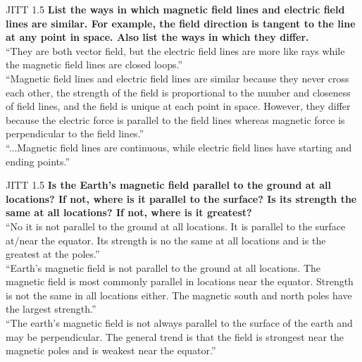 \documentclass{beamer}
\begin{document}
\begin{frame}{JITT 1.5}
\small
\textbf{List the ways in which magnetic field lines and electric field lines are similar. For example, the field direction is tangent to the line at any point in space. Also list the ways in which they differ.} \\ \vspace{0.5cm}
``They are both vector field, but the electric field lines are more like rays while the magnetic field lines are closed loops.'' \\ \vspace{0.5cm}
``Magnetic field lines and electric field lines are similar because they never cross each other, the strength of the field is proportional to the number and closeness of field lines, and the field is unique at each point in space. However, they differ because the electric force is parallel to the field lines whereas magnetic force is perpendicular to the field lines.'' \\ \vspace{0.5cm}
``...Magnetic field lines are continuous, while electric field lines have starting and ending points.''
\end{frame}

\begin{frame}{JITT 1.5}
\small
\textbf{Is the Earth’s magnetic field parallel to the ground at all locations? If not, where is it parallel to the surface? Is its strength the same at all locations? If not, where is it greatest?} \\ \vspace{0.5cm}
``No it is not parallel to the ground at all locations. It is parallel to the surface at/near the equator. Its strength is no the same at all locations and is the greatest at the poles.'' \\ \vspace{0.5cm}
``Earth’s magnetic field is not parallel to the ground at all locations. The magnetic field is most commonly parallel in locations near the equator. Strength is not the same in all locations either. The magnetic south and north poles have the largest strength.'' \\ \vspace{0.5cm}
``The earth's magnetic field is not always parallel to the surface of the earth and may be perpendicular. The general trend is that the field is strongest near the magnetic poles and is weakest near the equator.''
\end{frame}
\end{document}
